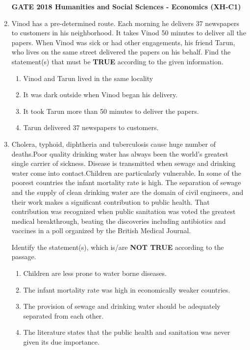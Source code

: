 \documentclass[journal,12pt,onecolumn]{exam}
\theoremstyle{remark}
\begin{document}
\begin{enumerate}
\newpage
\textbf{GATE 2018 Humanities and Social Sciences - Economics (XH-C1)}
\item Vinod has a pre-determined route. Each morning he delivers 37 newspapers to
customers in his neighborhood. It takes Vinod 50 minutes to deliver all the papers.
When Vinod was sick or had other engagements, his friend Tarun, who lives on the
same street delivered the papers on his behalf. 
\vspace{1em}
Find the statement(s) that must be \textbf{TRUE} according to the given information. 
\begin{enumerate}
    \item Vinod and Tarun lived in the same locality   
    \item It was dark outside when Vinod began his delivery. 
    \item It took Tarun more than 50 minutes to deliver the papers. 
    \item Tarun delivered 37 newspapers to customers. 
    
\end{enumerate}

\item Cholera, typhoid, diphtheria and tuberculosis cause huge number of deaths.Poor quality drinking water has always been the world's greatest single carrier of sickness. Disease is transmitted when sewage and drinking water come into contact.Children are particularly vulnerable. In some of the poorest countries the infant mortality rate is high. The separation of sewage and the supply of clean drinking water are the domain of civil engineers, and their work makes a significant contribution to public health. That contribution was recognized when public sanitation was voted the greatest medical breakthrough, beating the discoveries including antibiotics and vaccines in a poll organized by the British Medical Journal.

\vspace{1em}
Identify the statement(s), which is/are \textbf{NOT TRUE} according to the passage.
\begin{enumerate}
    \item Children are less prone to water borne diseases. 
    \item The infant mortality rate was high in economically weaker countries.
    \item The provision of sewage and drinking water should be adequately separated from each other. 
    \item The literature states that the public health and sanitation was never given its due importance. 


\end{enumerate}
\end{enumerate}
\end{document}
